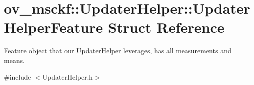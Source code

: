 \hypertarget{structov__msckf_1_1UpdaterHelper_1_1UpdaterHelperFeature}{}\section{ov\+\_\+msckf\+:\+:Updater\+Helper\+:\+:Updater\+Helper\+Feature Struct Reference}
\label{structov__msckf_1_1UpdaterHelper_1_1UpdaterHelperFeature}


Feature object that our \hyperlink{classov__msckf_1_1UpdaterHelper}{Updater\+Helper} leverages, has all measurements and means.  




{\ttfamily \#include $<$Updater\+Helper.\+h$>$}

